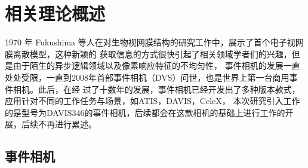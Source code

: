 \chapter{相关理论概述}
1970 年 Fukushima 等人\cite{fukushima1970electronic}在对生物视网膜结构的研究工作中，展示了首个电子视网膜离散模型，这种新颖的
获取信息的方式很快引起了相关领域学者们的兴趣，但是由于陌生的异步逻辑领域以及像素响应特征的不均匀性，
事件相机的发展一直处处受限，一直到2008年首部事件相机（DVS）问世，也是世界上第一台商用事件相机。此后，在经
过了十数年的发展，事件相机已经开发出了多种版本款式，应用针对不同的工作任务与场景，如ATIS，DAVIS，CeleX，
本次研究引入工作的是型号为DAVIS346的事件相机，后续都会在这款相机的基础上进行工作的开展，后续不再进行累述。

\section{事件相机}
